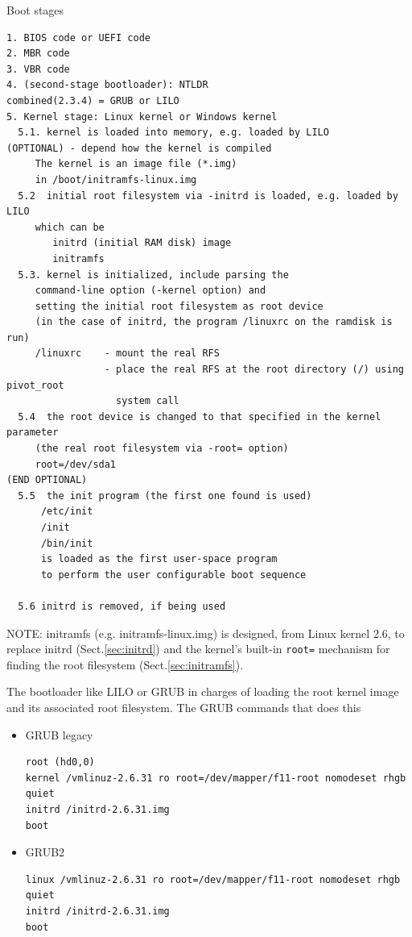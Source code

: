 Boot stages
\begin{verbatim}
1. BIOS code or UEFI code
2. MBR code
3. VBR code
4. (second-stage bootloader): NTLDR
combined(2.3.4) = GRUB or LILO
5. Kernel stage: Linux kernel or Windows kernel
  5.1. kernel is loaded into memory, e.g. loaded by LILO
(OPTIONAL) - depend how the kernel is compiled
     The kernel is an image file (*.img) 
     in /boot/initramfs-linux.img  
  5.2  initial root filesystem via -initrd is loaded, e.g. loaded by LILO
     which can be 
        initrd (initial RAM disk) image 
        initramfs     
  5.3. kernel is initialized, include parsing the
     command-line option (-kernel option) and
     setting the initial root filesystem as root device
     (in the case of initrd, the program /linuxrc on the ramdisk is run)
     /linuxrc    - mount the real RFS 
                 - place the real RFS at the root directory (/) using pivot_root
                   system call  
  5.4  the root device is changed to that specified in the kernel parameter
     (the real root filesystem via -root= option)
     root=/dev/sda1
(END OPTIONAL)     
  5.5  the init program (the first one found is used)
      /etc/init
      /init
      /bin/init
      is loaded as the first user-space program
      to perform the user configurable boot sequence
  
  5.6 initrd is removed, if being used
\end{verbatim}

NOTE: initramfs (e.g. initramfs-linux.img) is designed, from Linux kernel 2.6,
to replace initrd (Sect.\ref{sec:initrd}) and the kernel's built-in \verb!root=!
mechanism for finding the root filesystem (Sect.\ref{sec:initramfs}).

The bootloader like LILO or GRUB in charges of loading the root kernel image and
its associated root filesystem. The GRUB commands that does this
\begin{itemize}
  \item GRUB legacy
  
\begin{verbatim}
root (hd0,0)
kernel /vmlinuz-2.6.31 ro root=/dev/mapper/f11-root nomodeset rhgb quiet
initrd /initrd-2.6.31.img
boot 
\end{verbatim}
  
  \item GRUB2

\begin{verbatim}
linux /vmlinuz-2.6.31 ro root=/dev/mapper/f11-root nomodeset rhgb quiet
initrd /initrd-2.6.31.img
boot 
\end{verbatim}  
\end{itemize}

